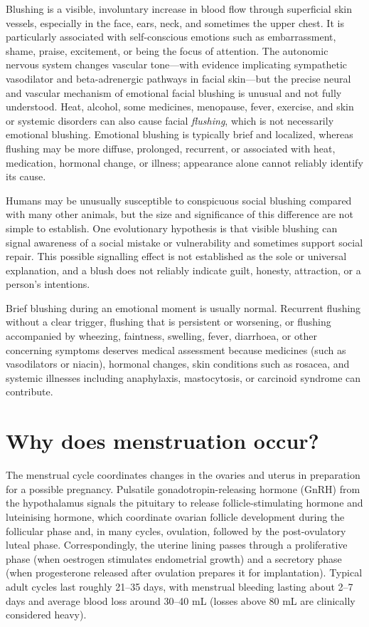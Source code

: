 \documentclass[11pt,oneside]{report}
\begin{document}
Blushing is a visible, involuntary increase in blood flow through superficial
skin vessels, especially in the face, ears, neck, and sometimes the upper chest.
It is particularly associated with self-conscious emotions such as
embarrassment, shame, praise, excitement, or being the focus of attention. The
autonomic nervous system changes vascular tone—with evidence implicating
sympathetic vasodilator and beta-adrenergic pathways in facial skin—but the
precise neural and vascular mechanism of emotional facial blushing is unusual
and not fully understood. Heat, alcohol, some medicines, menopause, fever, exercise, and
skin or systemic disorders can also cause facial \emph{flushing}, which is not
necessarily emotional blushing. Emotional blushing is typically brief and
localized, whereas flushing may be more diffuse, prolonged, recurrent, or
associated with heat, medication, hormonal change, or illness; appearance alone
cannot reliably identify its cause.

Humans may be unusually susceptible to conspicuous social blushing compared
with many other animals, but the size and significance of this difference are
not simple to establish. One evolutionary hypothesis is that visible blushing
can signal awareness of a social mistake or vulnerability and sometimes support
social repair. This possible signalling effect is not established as the sole
or universal explanation, and a blush does not reliably indicate guilt,
honesty, attraction, or a person's intentions.

Brief blushing during an emotional moment is usually normal. Recurrent flushing
without a clear trigger, flushing that is persistent or worsening, or flushing
accompanied by wheezing, faintness, swelling, fever, diarrhoea, or other
concerning symptoms deserves medical assessment because medicines (such as
vasodilators or niacin), hormonal changes, skin conditions such as rosacea, and
systemic illnesses including anaphylaxis, mastocytosis, or carcinoid syndrome
can contribute.

\section{Why does menstruation occur?}

The menstrual cycle coordinates changes in the ovaries and uterus in preparation
for a possible pregnancy. Pulsatile gonadotropin-releasing hormone (GnRH) from
the hypothalamus signals the pituitary to release
follicle-stimulating hormone and luteinising hormone, which coordinate ovarian
follicle development during the follicular phase and, in many cycles, ovulation,
followed by the post-ovulatory luteal phase. Correspondingly, the uterine
lining passes through a proliferative phase (when oestrogen stimulates
endometrial growth) and a secretory phase (when progesterone released after
ovulation prepares it for implantation). Typical adult cycles last roughly
21--35 days, with menstrual bleeding lasting about 2--7 days and average blood
loss around 30--40 mL (losses above 80 mL are clinically considered heavy).
\end{document}
